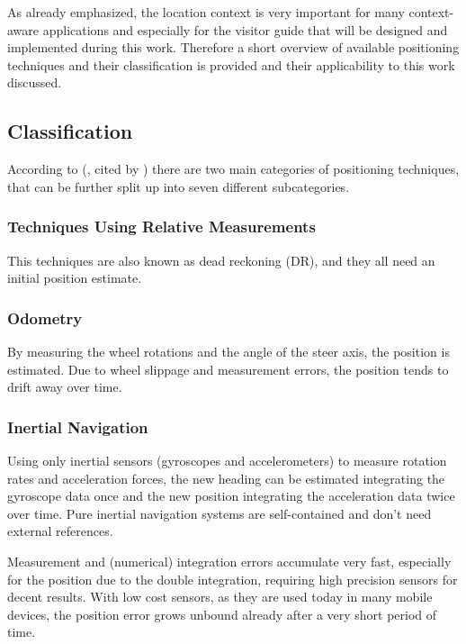 As already emphasized, the location context is very important for many context-aware applications and especially for the visitor guide that will be designed and implemented during this work. 
Therefore a short overview of available positioning techniques and their classification is provided and their applicability to this work discussed. 

\subsection{Classification}

According to (\cite{positioning}, cited by \cite[Ch. 1.1]{ellipsoid}) there are two main categories of positioning techniques, that can be further split up into seven different subcategories.

\subsubsection{Techniques Using Relative Measurements}

This techniques are also known as dead reckoning (DR), and they all need an initial position estimate.

\subsubsection*{Odometry}

By measuring the wheel rotations and the angle of the steer axis, the position is estimated. Due to wheel slippage and measurement errors, the position tends to drift away over time.

\subsubsection*{Inertial Navigation}

Using only inertial sensors (gyroscopes and accelerometers) to measure rotation rates and acceleration forces, the new heading can be estimated integrating the gyroscope data once and the new position integrating the acceleration data twice over time. Pure inertial navigation systems are self-contained and don't need external references.%

Measurement and (numerical) integration errors accumulate very fast, especially for the position due to the double integration, requiring high precision sensors for decent results. With low cost sensors, as they are used today in many mobile devices, the position error grows unbound already after a very short period of time.

